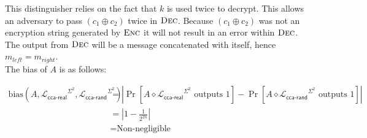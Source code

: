 \documentclass[12pt]{article}
\renewcommand{\L}{\ensuremath{\mathscr{L}}\xspace}
\newcommand{\lib}[1]{\ensuremath{\L_{\textsf{#1}}}\xspace}
\newcommand{\myterm}[1]{\ensuremath{\text{#1}}\xspace}
\newcommand{\bias}{\myterm{bias}}
\newcommand{\link}{\diamond}
\newcommand{\subname}[1]{\ensuremath{\textsc{#1}}\xspace}
\begin{document}
\noindent
This distinguisher relies on the fact that $k$ is used twice to decrypt.
This allows an adversary to pass $(c_1 \oplus c_2)$ twice in 
$\subname{Dec}$. Because $(c_1 \oplus c_2)$ was not an encryption string
generated by $\subname{Enc}$ it will not result in an error within
$\subname{Dec}$. The output from $\subname{Dec}$ will be a message
concatenated with itself, hence $m_{left} = m_{right}$. \\

\noindent
The bias of $A$ is as follows:

\begin{align*}
    \bias(A,\lib{cca-real}^{\Sigma^2},\lib{cca-rand}^{\Sigma^2}) &=
    |\Pr[A \link \lib{cca-real}^{\Sigma^2} \mbox{ outputs 1}] - \Pr[A \link \lib{cca-rand}^{\Sigma^2} \mbox{ outputs 1}]| \\
    &= | 1 - \frac{1}{2^{2n}} | \\
    &= \text{Non-negligible}
\end{align*}
\end{document}
